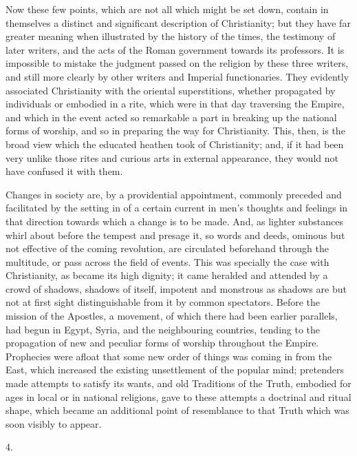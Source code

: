 Now these few points, which are not all which might be
set down, contain in themselves a distinct and
significant description of Christianity; but they have
far greater meaning when illustrated by the history of
the times, the testimony of later writers, and the acts
of the Roman government towards its professors. It is
impossible to mistake the judgment passed on the religion
by these three writers, and still more clearly by other
writers and Imperial functionaries. They evidently
associated Christianity with the oriental superstitions,
whether propagated by individuals or embodied in a rite,
which were in that day traversing the Empire, and which
in the event acted so remarkable a part in breaking up
the national forms of worship, and so in preparing the
way for Christianity. This, then, is the broad view which
the educated heathen took of Christianity; and, if it had
been very unlike those rites and curious arts in external
appearance, they would not have confused it with them.

Changes in society are, by a providential appointment,
commonly preceded and facilitated by the setting in of a
certain current in men's thoughts and feelings in that
direction towards which a change is to be made. And, as
lighter substances whirl about before the tempest and
presage it, so words and deeds, ominous but not effective
of the coming revolution, are circulated beforehand
through the multitude, or pass across the field of
events. This was specially the case with Christianity, as
became its high dignity; it came heralded and attended by
a crowd of shadows, shadows of itself, impotent and
monstrous as shadows are but not at first sight
distinguishable from it by common spectators. Before the
mission of the Apostles, a movement, of which there had
been earlier parallels, had begun in Egypt, Syria, and
the neighbouring countries, tending to the propagation of
new and peculiar forms of worship throughout the Empire.
Prophecies were afloat that some new order of things was
coming in from the East, which increased the existing
unsettlement of the popular mind; pretenders made
attempts to satisfy its wants, and old Traditions of the
Truth, embodied for ages in local or in national
religions, gave to these attempts a doctrinal and ritual
shape, which became an additional point of resemblance to
that Truth which was soon visibly to appear.

4.

